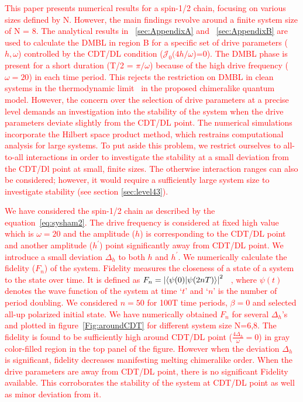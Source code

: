 \documentclass[12pt]{iopart}
\newcommand{\red}[1]{\textcolor{red}{#1}}
\begin{document}
\red{This paper presents numerical results for a spin-1/2 chain, focusing on various sizes defined by N. However, the main findings revolve around a finite system size of N = 8. The analytical results in ~\ref{sec:AppendixA} and ~\ref{sec:AppendixB} are used to calculate the DMBL in region B for a specific set of drive parameters ($h, \omega$) controlled by the CDT/DL condition ($\mathcal{J}_0(4h/\omega$)=0). The DMBL phase is present for a short duration (T/2 = $\pi/\omega$) because of the high drive frequency ($\omega=20$) in each time period. This rejects the restriction on DMBL in clean systems in the thermodynamic limit~\cite{Mahbub2024} in the proposed chimeralike quantum model. However, the concern over the selection of drive parameters at a precise level demands an investigation into the stability of the system when the drive parameters deviate slightly from the CDT/DL point. The numerical simulations incorporate the Hilbert space product method, which restrains computational analysis for large systems. To put aside this problem, we restrict ourselves to all-to-all interactions in order to investigate the stability at a small deviation from the CDT/Dl point at small, finite sizes. The otherwise interaction ranges can also be considered; however, it would require a sufficiently large system size to investigate stability (see section \ref{sec:level43}).}

\red{We have considered the spin-1/2 chain as described by the equation~\ref{eq:sysham2}. The drive frequency is considered at fixed high value which is $\omega=20$ and the amplitude ($h$) is corresponding to the CDT/DL point and another amplitude ($h^\prime$) point significantly away from CDT/DL point. We introduce a small deviation $\Delta_h$ to both $h$ and $h^\prime$. We numerically calculate the fidelity ($F_n$) of the system. Fidelity measures the closeness of a state of a system to the state over time. It is defined as $F_n = \abs{\braket{\psi(0)}{\psi (2nT)}}^2$ ~\cite{Jozsa1994,Liu2023}, where $\psi(t)$ denotes the wave function of the system at time `$t$' and `$n$' is the number of period doubling. We considered $n=50$ for 100T time periods, $\beta=0$ and selected all-up polarized initial state. We have numerically obtained $F_n$ for several $\Delta_h$'s and plotted in figure~\ref{Fig:aroundCDT} for different system size N=6,8. The fidelity is found to be sufficiently high around CDT/DL point ($\frac{4\Delta_h}{\omega} = 0$) in gray color-filled region in the top panel of the figure. However when the deviation $\Delta_h$ is significant, fidelity decreases manifesting melting chimeralike order. When the drive parameters are away from CDT/DL point, there is no significant Fidelity available. This corroborates the stability of the system at CDT/DL point as well as minor deviation from it.}



\end{document}

